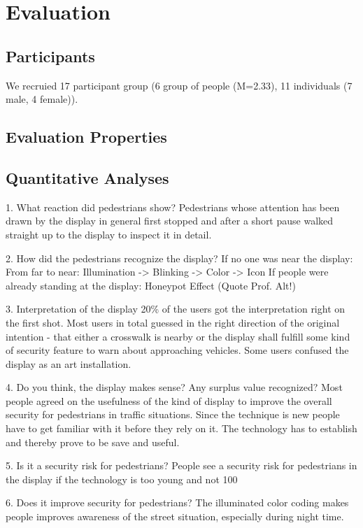 \section{Evaluation}
\subsection{Participants}
We recruied 17 participant group (6 group of people (M=2.33), 11 individuals (7 male, 4 female)).

\subsection{Evaluation Properties}
\subsection{Quantitative Analyses}

1. What reaction did pedestrians show?
Pedestrians whose attention has been drawn by the display in general first stopped and after a short pause walked straight up to the display to inspect it in detail.

2. How did the pedestrians recognize the display?
If no one was near the display:
From far to near: Illumination -> Blinking -> Color -> Icon
If people were already standing at the display:
Honeypot Effect (Quote Prof. Alt!)

3. Interpretation of the display
20\% of the users got the interpretation right on the first shot. Most users in total guessed in the right direction of the original intention - that either a crosswalk is nearby or the display shall fulfill some kind of security feature to warn about approaching vehicles. 
Some users confused the display as an art installation.

4. Do you think, the display makes sense? Any surplus value recognized? 
Most people agreed on the usefulness of the kind of display to improve the overall security for pedestrians in traffic situations. Since the technique is new people have to get familiar with it before they rely on it. The technology has to establish and thereby prove to be save and useful.

5. Is it a security risk for pedestrians?
People see a security risk for pedestrians in the display if the technology is too young and not 100%

6. Does it improve security for pedestrians?
The illuminated color coding makes people improves awareness of the street situation, especially during night time. 

